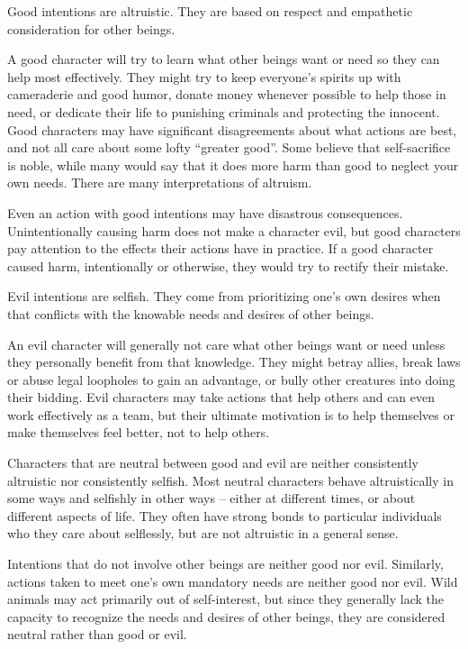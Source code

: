      Good intentions are altruistic.
    They are based on respect and empathetic consideration for other beings.

    A good character will try to learn what other beings want or need so they can help most effectively.
    They might try to keep everyone's spirits up with cameraderie and good humor, donate money whenever possible to help those in need, or dedicate their life to punishing criminals and protecting the innocent.
    Good characters may have significant disagreements about what actions are best, and not all care about some lofty ``greater good''.
    Some believe that self-sacrifice is noble, while many would say that it does more harm than good to neglect your own needs.
    There are many interpretations of altruism.

    Even an action with good intentions may have disastrous consequences.
    Unintentionally causing harm does not make a character evil, but good characters pay attention to the effects their actions have in practice.
    If a good character caused harm, intentionally or otherwise, they would try to rectify their mistake.

     Evil intentions are selfish.
    They come from prioritizing one's own desires when that conflicts with the knowable needs and desires of other beings.

    An evil character will generally not care what other beings want or need unless they personally benefit from that knowledge.
    They might betray allies, break laws or abuse legal loopholes to gain an advantage, or bully other creatures into doing their bidding.
    Evil characters may take actions that help others and can even work effectively as a team, but their ultimate motivation is to help themselves or make themselves feel better, not to help others.

     Characters that are neutral between good and evil are neither consistently altruistic nor consistently selfish.
    Most neutral characters behave altruistically in some ways and selfishly in other ways -- either at different times, or about different aspects of life.
    They often have strong bonds to particular individuals who they care about selflessly, but are not altruistic in a general sense.

    Intentions that do not involve other beings are neither good nor evil.
    Similarly, actions taken to meet one's own mandatory needs are neither good nor evil.
    Wild animals may act primarily out of self-interest, but since they generally lack the capacity to recognize the needs and desires of other beings, they are considered neutral rather than good or evil.

